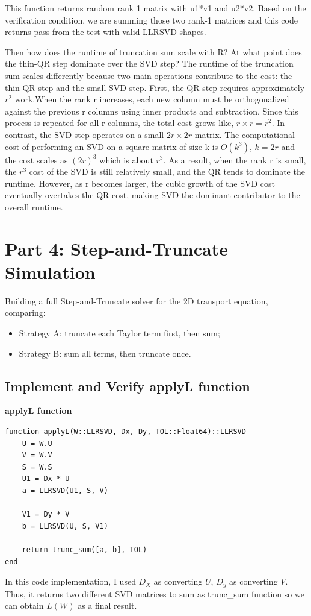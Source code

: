 \documentclass[11pt]{report}
\begin{document}
This function returns random rank 1 matrix with u1*v1 and u2*v2. Based on the verification condition, we are summing those two rank-1 matrices and this code returns pass from the test with valid LLRSVD shapes.

\vspace{2em}

Then how does the runtime of truncation sum scale with R? At what point does the thin-QR step dominate over the SVD step? The runtime of the truncation sum scales differently because two main operations contribute to the cost: the thin QR step and the small SVD step. First, the QR step requires approximately $r^2$ work.When the rank r increases, each new column must be orthogonalized against the previous r columns using inner products and subtraction. Since this process is repeated for all r columns, the total cost grows like, $ r \times r = r^2$. In contrast, the SVD step operates on a small $ 2r \times 2r$ matrix. The computational cost of performing an SVD on a square matrix of size k is $O(k^3)$, $k = 2r$ and the cost scales as $(2r)^3$ which is about $r^3$. As a result, when the rank r is small, the $r^3$ cost of the SVD is still relatively small, and the QR tends to dominate the runtime. However, as r becomes larger, the cubic growth of the SVD cost eventually overtakes the QR cost, making SVD the dominant contributor to the overall runtime.



\section{Part 4: Step-and-Truncate Simulation}

Building a full Step-and-Truncate solver for the 2D transport equation, comparing:
\begin{itemize}[leftmargin=*]
    \item Strategy A: truncate each Taylor term first, then sum;
    \item Strategy B: sum all terms, then truncate once.
\end{itemize}

\subsection{Implement and Verify applyL function}
\textbf{applyL function}
\begin{lstlisting}
function applyL(W::LLRSVD, Dx, Dy, TOL::Float64)::LLRSVD
    U = W.U
    V = W.V
    S = W.S
    U1 = Dx * U
    a = LLRSVD(U1, S, V)

    V1 = Dy * V
    b = LLRSVD(U, S, V1)

    return trunc_sum([a, b], TOL)
end

\end{lstlisting}
In this code implementation, I used $D_X$ as converting $U$, $D_y$ as converting $V$. Thus, it returns two different SVD matrices to sum as trunc\_sum function so we can obtain $L(W)$ as a final result.
\end{document}

